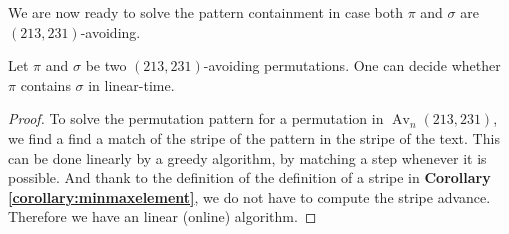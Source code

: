 \documentclass[a4paper]{llncs}
\DeclareMathOperator{\AV}{Av}
\begin{document}
We are now ready to solve the pattern containment in case
both $\pi$ and $\sigma$ are $(213, 231)$-avoiding.

\begin{proposition}
	Let $\pi$ and $\sigma$ be two $(213,231)$-avoiding permutations.
	One can decide whether $\pi$ contains $\sigma$ in linear-time.
\end{proposition}

\begin{proof}
To solve the permutation pattern for a permutation in $\AV_n(213,231)$, 
we find a find a match of the stripe of the pattern in the stripe of the text.
This can be done linearly by a greedy algorithm, 
by matching a step whenever it is possible.
And thank to the definition of the definition of a stripe in \textbf{Corollary \ref{corollary:minmaxelement}},
we do not have to compute the stripe advance.
Therefore we have an linear (online) algorithm.
\end{proof}	

		
\end{document}

